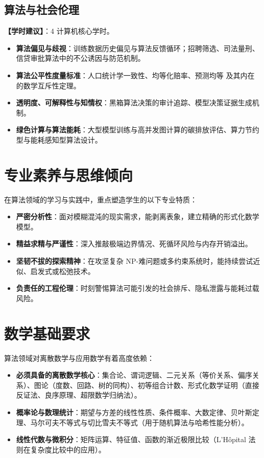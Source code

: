 \subsection{算法与社会伦理}
\textbf{【学时建议】}：4 计算机核心学时。

\begin{itemize}
    \item \textbf{算法偏见与歧视}：训练数据历史偏见与算法反馈循环；招聘筛选、司法量刑、信贷审批算法中的不公诱因与防范机制。
    \item \textbf{算法公平性度量标准}：人口统计学一致性、均等化赔率、预测均等 及其内在的数学互斥性定理。
    \item \textbf{透明度、可解释性与知情权}：黑箱算法决策的审计追踪、模型决策证据生成机制。
    \item \textbf{绿色计算与算法能耗}：大型模型训练与高并发图计算的碳排放评估、算力节约型与能耗感知型算法设计。
\end{itemize}

\section{专业素养与思维倾向}

在算法领域的学习与实践中，重点塑造学生的以下专业特质：
\begin{itemize}
    \item \textbf{严密分析性}：面对模糊混沌的现实需求，能剥离表象，建立精确的形式化数学模型。
    \item \textbf{精益求精与严谨性}：深入推敲极端边界情况、死循环风险与内存开销溢出。
    \item \textbf{坚韧不拔的探索精神}：在攻坚复杂 NP-难问题或多约束系统时，能持续尝试近似、启发式或松弛技术。
    \item \textbf{负责任的工程伦理}：时刻警惕算法可能引发的社会排斥、隐私泄露与能耗过载风险。
\end{itemize}

\section{数学基础要求}

算法领域对离散数学与应用数学有着高度依赖：
\begin{itemize}
    \item \textbf{必须具备的离散数学核心}：集合论、谓词逻辑、二元关系（等价关系、偏序关系）、图论（度数、回路、树的同构）、初等组合计数、形式化数学证明（直接反证法、良序原理、超限数学归纳法）。
    \item \textbf{概率论与数理统计}：期望与方差的线性性质、条件概率、大数定律、贝叶斯定理、马尔可夫不等式与切比雪夫不等式（用于随机算法与哈希性能分析）。
    \item \textbf{线性代数与微积分}：矩阵运算、特征值、函数的渐近极限比较（L'H\^opital 法则在复杂度比较中的应用）。
\end{itemize}

